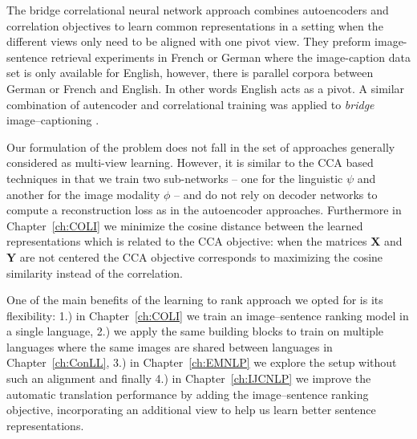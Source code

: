 The bridge correlational neural network approach \citep{rajendran2015bridge}
combines autoencoders and correlation objectives to
learn common representations in a setting when the different views only need to be
aligned with one pivot view. They preform
image-sentence retrieval experiments in French or German where
the image-caption data set is only available for English, however,
there is parallel corpora between German or French and English. In other words English acts as a pivot.
A similar combination of autencoder and correlational training was applied to \emph{bridge}
image--captioning \citep{saha2016correlational}.

Our formulation of the problem does not fall in the set of approaches generally
considered as multi-view learning.  However, it is similar to the CCA based techniques in that we
train two sub-networks -- one for the linguistic $\psi$ and another for the image modality $\phi$ --
and do not rely on decoder networks to compute a reconstruction  loss as in the autoencoder approaches.
Furthermore in Chapter~\ref{ch:COLI} we minimize the cosine distance between the learned representations
which is related to the CCA objective: when the matrices $\mathbf{X}$ and  $\mathbf{Y}$ are not centered
the CCA objective corresponds to maximizing the cosine similarity instead of the correlation.

One of the main benefits of the learning to rank approach we opted for is
its flexibility: 1.) in Chapter~\ref{ch:COLI} we train an image--sentence ranking model in a single
language, 2.) we apply the same building blocks to train on multiple languages where
the same images are shared between languages in Chapter~\ref{ch:ConLL}, 3.) in
Chapter~\ref{ch:EMNLP} we explore the setup without such an alignment and finally 4.)
in Chapter~\ref{ch:IJCNLP} we improve the automatic translation  performance
by adding the image--sentence ranking objective, incorporating an additional view
to help us learn better sentence representations.

